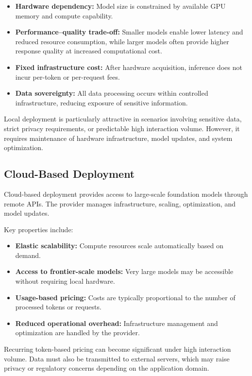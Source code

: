 \begin{itemize}
    \item \textbf{Hardware dependency:} Model size is constrained by available GPU memory and compute capability.
    \item \textbf{Performance--quality trade-off:} Smaller models enable lower latency and reduced resource consumption, while larger models often provide higher response quality at increased computational cost.
    \item \textbf{Fixed infrastructure cost:} After hardware acquisition, inference does not incur per-token or per-request fees.
    \item \textbf{Data sovereignty:} All data processing occurs within controlled infrastructure, reducing exposure of sensitive information.
\end{itemize}

Local deployment is particularly attractive in scenarios involving sensitive data, strict privacy requirements, or predictable high interaction volume.
However, it requires maintenance of hardware infrastructure, model updates, and system optimization.

\subsection{Cloud-Based Deployment}

Cloud-based deployment provides access to large-scale foundation models through remote APIs.
The provider manages infrastructure, scaling, optimization, and model updates.

Key properties include:

\begin{itemize}
    \item \textbf{Elastic scalability:} Compute resources scale automatically based on demand.
    \item \textbf{Access to frontier-scale models:} Very large models may be accessible without requiring local hardware.
    \item \textbf{Usage-based pricing:} Costs are typically proportional to the number of processed tokens or requests.
    \item \textbf{Reduced operational overhead:} Infrastructure management and optimization are handled by the provider.
\end{itemize}

Recurring token-based pricing can become significant under high interaction volume.
Data must also be transmitted to external servers, which may raise privacy or regulatory concerns depending on the application domain.

